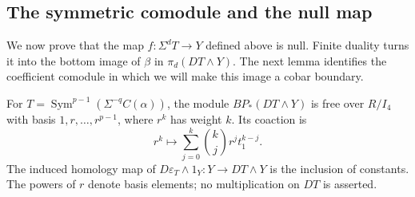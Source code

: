 \subsection{The symmetric comodule and the null map}

We now prove that the map $f:\Sigma^dT\to Y$ defined above is null.
Finite duality turns it into the bottom image of $\beta$ in
$\pi_d(DT\wedge Y)$. The next lemma identifies the coefficient
comodule in which we will make this image a cobar boundary.

\begin{lemma}
\label{top:symmetric-comodule}
For $T=\operatorname{Sym}^{p-1}(\Sigma^{-q}C(\alpha))$, the module
$BP_*(DT\wedge Y)$ is free over $R/I_4$ with basis
$1,r,\ldots,r^{p-1}$, where $r^k$ has weight $k$. Its coaction is
\begin{equation}
\label{top:translated-comodule}
 r^k\longmapsto\sum_{j=0}^k\binom kjr^jt_1^{k-j}.
\end{equation}
The induced homology map of
$D\varepsilon_T\wedge1_Y:Y\to DT\wedge Y$ is the inclusion
of constants. The powers of $r$ denote basis elements; no
multiplication on $DT$ is asserted.
\end{lemma}

